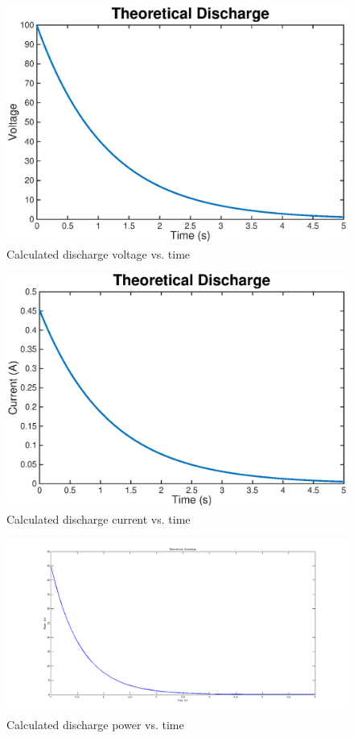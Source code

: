 \documentclass{article}
\begin{document}
    \begin{figure}[H]
        \centering
        \includegraphics[width = 0.8 \textwidth]{dischargevoltage}
        \caption{Calculated discharge voltage vs. time}
        \label{voltagedischarge}
    \end{figure}

    \begin{figure}[H]
        \centering
        \includegraphics[width = 0.8 \textwidth]{dischargecurrent}
        \caption{Calculated discharge current vs. time}
        \label{currentdischarge}
    \end{figure}

    \begin{figure}[H]
        \centering
        \includegraphics[width = 0.8 \textwidth]{powerdischarge}
        \caption{Calculated discharge power vs. time}
        \label{powerdischarge}
    \end{figure}
\end{document}

